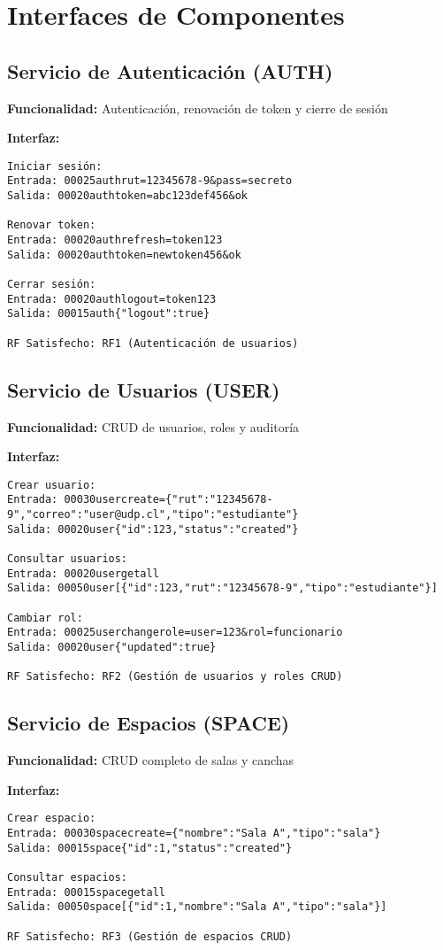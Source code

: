 \documentclass[a4paper, titlepage, 12pt]{article}
\begin{document}
\newpage
\section{Interfaces de Componentes}

\subsection{Servicio de Autenticación (AUTH)}
\textbf{Funcionalidad:} Autenticación, renovación de token y cierre de sesión

\textbf{Interfaz:}
\begin{verbatim}
Iniciar sesión:
Entrada: 00025authrut=12345678-9&pass=secreto
Salida: 00020authtoken=abc123def456&ok

Renovar token:
Entrada: 00020authrefresh=token123
Salida: 00020authtoken=newtoken456&ok

Cerrar sesión:
Entrada: 00020authlogout=token123
Salida: 00015auth{"logout":true}

RF Satisfecho: RF1 (Autenticación de usuarios)
\end{verbatim}

\subsection{Servicio de Usuarios (USER)}
\textbf{Funcionalidad:} CRUD de usuarios, roles y auditoría

\textbf{Interfaz:}
\begin{verbatim}
Crear usuario:
Entrada: 00030usercreate={"rut":"12345678-9","correo":"user@udp.cl","tipo":"estudiante"}
Salida: 00020user{"id":123,"status":"created"}

Consultar usuarios:
Entrada: 00020usergetall
Salida: 00050user[{"id":123,"rut":"12345678-9","tipo":"estudiante"}]

Cambiar rol:
Entrada: 00025userchangerole=user=123&rol=funcionario
Salida: 00020user{"updated":true}

RF Satisfecho: RF2 (Gestión de usuarios y roles CRUD)
\end{verbatim}

\newpage
\subsection{Servicio de Espacios (SPACE)}
\textbf{Funcionalidad:} CRUD completo de salas y canchas

\textbf{Interfaz:}
\begin{verbatim}
Crear espacio:
Entrada: 00030spacecreate={"nombre":"Sala A","tipo":"sala"}
Salida: 00015space{"id":1,"status":"created"}

Consultar espacios:
Entrada: 00015spacegetall
Salida: 00050space[{"id":1,"nombre":"Sala A","tipo":"sala"}]

RF Satisfecho: RF3 (Gestión de espacios CRUD)
\end{verbatim}
\end{document}
